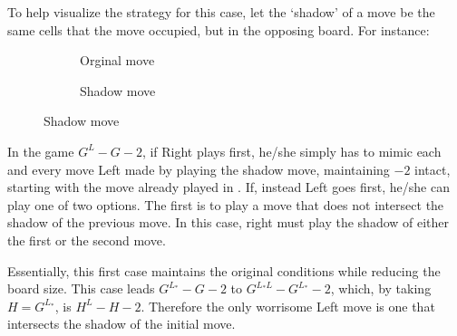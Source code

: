 To help visualize the strategy for this case, let the `shadow' of a move be the same cells that the move occupied, but in the opposing board. For instance:

\begin{figure}[h]
	\centering
	\begin{subfigure}{0.3\linewidth} \centering
		\caption*{Orginal move}
	\end{subfigure}
	\begin{subfigure}{0.3\linewidth} \centering
		\caption*{Shadow move}
	\end{subfigure}
\end{figure}

In the game $G^L -G -2$, if Right plays first, he/she simply has to mimic each and every move Left made by playing the shadow move, maintaining $-2$ intact, starting with the move already played in . If, instead Left goes first, he/she can play one of two options. The first is to play a move that does not intersect the shadow of the previous move. In this case, right must play the shadow of either the first or the second move.

Essentially, this first case maintains the original conditions while reducing the board size. This case leads $G^{L_*} -G -2$ to $G^{L_*L} -G^{L_*} -2$, which, by taking $H = G^{L_*}$, is $H^{L} -H -2$. Therefore the only worrisome Left move is one that intersects the shadow of the initial move.












